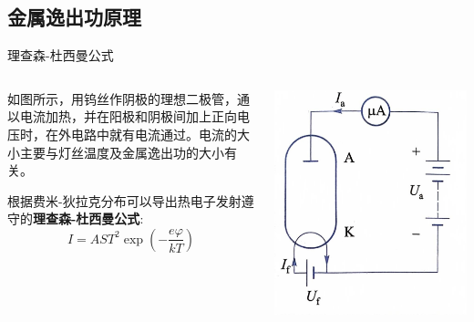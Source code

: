 \documentclass{beamer}
\begin{document}
    \subsection{金属逸出功原理}
    \begin{frame}{理查森-杜西曼公式}{\thesubsection \, \subsecname}
        \begin{columns}[T]
            \begin{column}{0.5\textwidth}
                如图所示，用钨丝作阴极的理想二极管，通以电流加热，并在阳极和阴极间加上正向电压时，在外电路中就有电流通过。电流的大小主要与灯丝温度及金属逸出功的大小有关。
                
                根据费米-狄拉克分布可以导出热电子发射遵守的\textbf{理查森-杜西曼公式}:
                \begin{equation}
                    I = AST^2\exp(-\frac{e\varphi}{kT})
                \end{equation}
            \end{column}
            \begin{column}{0.3\textwidth}
                \includegraphics[scale=0.2]{gallery/pic1.jpg}
                
            \end{column}
        \end{columns}
    \end{frame}
\end{document}
